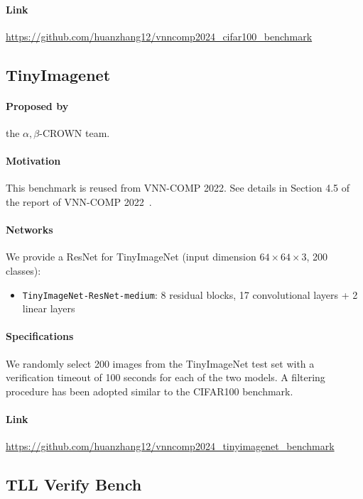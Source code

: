 \documentclass[oneside,11pt,dvipsnames]{book}
\begin{document}
\paragraph*{Link} \url{https://github.com/huanzhang12/vnncomp2024_cifar100_benchmark}


\subsection{TinyImagenet}

\paragraph*{Proposed by} the $\alpha,\!\beta$-CROWN team.
\paragraph*{Motivation} This benchmark is reused from VNN-COMP 2022. See details in Section 4.5 of the report of VNN-COMP 2022~\cite{muller2022vnncomp}.

\paragraph*{Networks} We provide a ResNet for TinyImageNet (input dimension $64 \times 64 \times 3$, 200 classes):
\begin{itemize}
    \item \texttt{TinyImageNet-ResNet-medium}: 8 residual blocks, 17 convolutional layers + 2 linear layers
\end{itemize}

\paragraph*{Specifications} We randomly select 200 images from the TinyImageNet test set with a verification timeout of 100 seconds for each of the two models. A filtering procedure has been adopted similar to the CIFAR100 benchmark.

\paragraph*{Link} \url{https://github.com/huanzhang12/vnncomp2024_tinyimagenet_benchmark}



\subsection{TLL Verify Bench}
\end{document}
